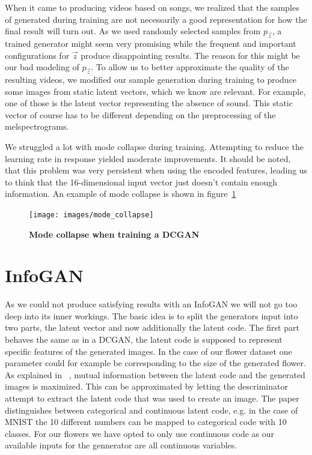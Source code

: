             When it came to producing videos based on songs, we realized that the samples of generated during training are not necessarily a good representation for how the final result will turn out. As we used randomly selected samples from $p_{\vec{z}}$, a trained generator might seem very promising while the frequent and important configurations for $\vec{z}$ produce disappointing results. The reason for this might be our bad modeling of $p_{\vec{z}}$. To allow us to better approximate the quality of the resulting videos, we modified our sample generation during training to produce some images from static latent vectors, which we know are relevant. For example, one of those is the latent vector representing the absence of sound. This static vector of course has to be different depending on the preprocessing of the melspectrograms.

            We struggled a lot with mode collapse during training. Attempting to reduce the learning rate in response yielded moderate improvements. It should be noted, that this problem was very persistent when using the encoded features, leading us to think that the 16-dimensional input vector just doesn't contain enough information. An example of mode collapse is shown in figure~\ref{fig:mode_collapse}

            \begin{figure}[h]
                \centering
                \texttt{[image: images/mode\_collapse]}
                \caption[DCGAN mode collapse]
                {
                    \textbf{Mode collapse when training a DCGAN}
                }
                \label{fig:mode_collapse}
            \end{figure}

    \section{InfoGAN}
        
        As we could not produce satisfying results with an InfoGAN we will not go too deep into its inner workings. The basic idea is to split the generators input into two parts, the latent vector and now additionally the latent code. The first part behaves the same as in a DCGAN, the latent code is supposed to represent specific features of the generated images. In the case of our flower dataset one parameter could for example be corresponding to the size of the generated flower. As explained in ~\cite{infogan}, mutual information between the latent code and the generated images is maximized. This can be approximated by letting the descriminator attempt to extract the latent code that was used to create an image. The paper distinguishes between categorical and continuous latent code, e.g. in the case of MNIST the 10 different numbers can be mapped to categorical code with 10 classes. For our flowers we have opted to only use continuous code as our available inputs for the gennerator are all continuous variables.

